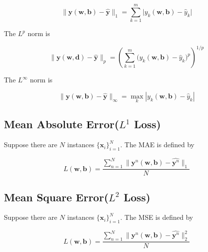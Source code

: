\documentclass{article}
\begin{document}
            \begin{equation*}
                \| \boldsymbol{y}(\boldsymbol{w},\boldsymbol{b}) -
                \hat{\boldsymbol{y}} \|_1 = \sum_{k=1}^m \big|
                y_k(\boldsymbol{w},\boldsymbol{b}) - \hat{y}_k \big| 
            \end{equation*}

            The $L^p$ norm is

            \begin{equation*}
                \| \boldsymbol{y}(\boldsymbol{w},\boldsymbol{d}) -
                \hat{\boldsymbol{y}}\|_p = \left( \sum_{k=1}^m
                \big(y_k(\boldsymbol{w},\boldsymbol{b})-\hat{y}_k\big)^p \right)^{1/p}
            \end{equation*}

            The $L^\infty$ norm is

            \begin{equation*}
                \| \boldsymbol{y}(\boldsymbol{w}, \boldsymbol{b}) -
                \hat{\boldsymbol{y}}\|_{\infty} = \max_{k}
                |y_k(\boldsymbol{w},\boldsymbol{b}) - \hat{y}_k| 
            \end{equation*}

        \subsection{Mean Absolute Error(\texorpdfstring{$L^1$}{L1} Loss)}

            Suppose there are $N$ instances $\{ \boldsymbol{x}_i \}_{i=1}^N$. The MAE is defined by

            \begin{equation*}
                L(\boldsymbol{w},\boldsymbol{b}) = \frac{\sum_{n=1}^N \|
                \boldsymbol{y}^n(\boldsymbol{w},\boldsymbol{b}) -
                \hat{\boldsymbol{y}^n} \|_1}{N}
            \end{equation*}

        \subsection{Mean Square Error(\texorpdfstring{$L^2$}{L2} Loss)}

            Suppose there are $N$ instances $\{ \boldsymbol{x}_i \}_{i=1}^N$. The MSE is defined by

            \begin{equation*}
                L(\boldsymbol{w},\boldsymbol{b}) = \frac{\sum_{n=1}^N \|
                \boldsymbol{y}^n(\boldsymbol{w},\boldsymbol{b}) -
                \hat{\boldsymbol{y}^n}\|_2^2}{N}
            \end{equation*}
\end{document}
